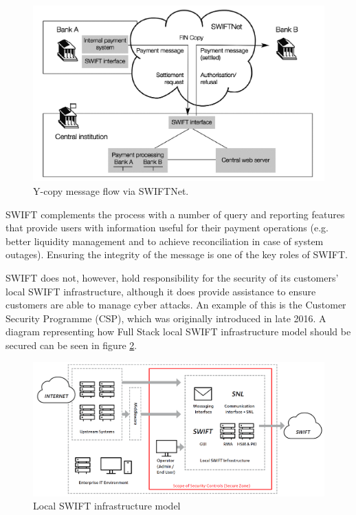 \documentclass[12pt]{article}
\begin{document}
        \begin{figure}[H]
        \centering
        \includegraphics[width=\textwidth,cfbox=red 0.1mm 0.1mm]{figures/swiftcloud.png}
        \caption{Y-copy message flow via SWIFTNet.}
        \label{fig:swiftcloud}
        \end{figure}
       
        SWIFT complements the process with a number of query and reporting features that provide users with information useful for their payment operations (e.g. better liquidity management and to achieve reconciliation in case of system outages). Ensuring the integrity of the message is one of the key roles of SWIFT.\cite{scottSocietyWorldwideInterbank2013}
        
        SWIFT does not, however, hold responsibility for the security of its customers’ local SWIFT infrastructure, although it does provide assistance to ensure customers are able to manage cyber attacks. An example of this is the Customer Security Programme (CSP), which was originally introduced in late 2016. A diagram representing how  Full Stack local SWIFT infrastructure model should be secured can be seen in figure \ref{fig:Swift}.
        
        \begin{figure}[H]
        \centering
        \includegraphics[width=\textwidth]{figures/swift.png}
        \caption{Local SWIFT infrastructure model}
        \label{fig:Swift}
        \end{figure}
        
\end{document}

